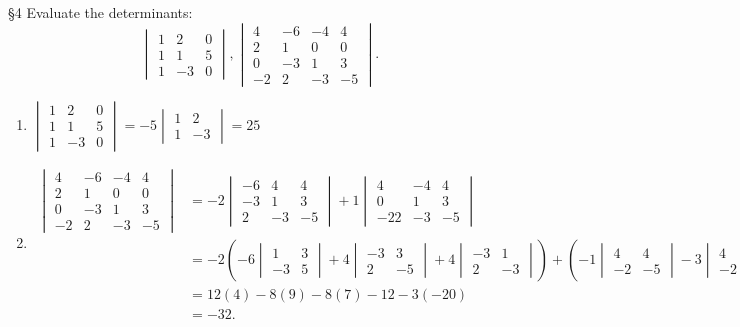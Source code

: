 \documentclass{review-sheet}
\begin{document}
\begin{problem}{\S 4}
  Evaluate the determinants:
  \[
    \begin{vmatrix} 1&2&0\\1&1&5\\1&-3&0 \end{vmatrix}, \begin{vmatrix} 4&-6&-4&4\\2&1&0&0\\0&-3&1&3\\-2&2&-3&-5 \end{vmatrix} 
  .\] 
\end{problem}

\begin{solution}
  \begin{enumerate}[label=(\alph*)]
    \item $\begin{vmatrix} 1&2&0\\1&1&5\\1&-3&0 \end{vmatrix}=-5\begin{vmatrix} 1&2\\1&-3 \end{vmatrix} =25$
    \item 
      \begin{align*}
        \begin{vmatrix} 4&-6&-4&4\\2&1&0&0\\0&-3&1&3\\-2&2&-3&-5 \end{vmatrix} &= -2\begin{vmatrix}
        -6&4&4\\-3&1&3\\2&-3&-5\end{vmatrix} +1\begin{vmatrix} 4&-4&4\\0&1&3\\-22&-3&-5 \end{vmatrix} \\
          &= -2\left( -6\begin{vmatrix} 1&3\\-3&5 \end{vmatrix} +4\begin{vmatrix} -3&3\\2&-5
      \end{vmatrix} +4\begin{vmatrix} -3&1\\2&-3 \end{vmatrix}  \right) +\left(-1\begin{vmatrix}
    4&4\\-2&-5 \end{vmatrix} -3\begin{vmatrix} 4&-4\\-2&-3 \end{vmatrix}  \right) \\
     &= 12(4)-8(9)-8(7)-12-3(-20)\\
     &=-32
      .\end{align*}
  \end{enumerate}
\end{solution}
\end{document}
